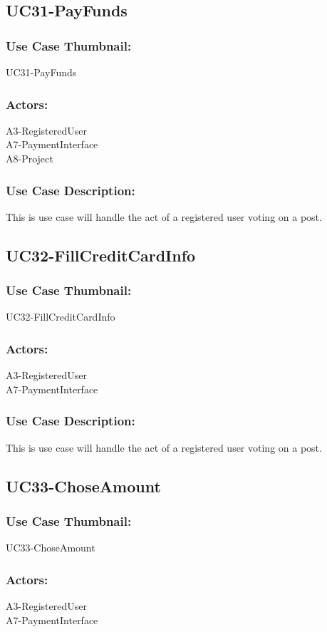 \documentclass[11pt, openany]{report}
\begin{document}
\subsection{UC31-PayFunds}
\label{sUC31}
\subsubsection*{Use Case Thumbnail:}
UC31-PayFunds
\subsubsection*{Actors:}
A3-RegisteredUser\\
A7-PaymentInterface\\
A8-Project
\subsubsection*{Use Case Description:}
This is use case will handle the act of a registered user voting on a post.

\subsection{UC32-FillCreditCardInfo}
\label{sUC32}
\subsubsection*{Use Case Thumbnail:}
UC32-FillCreditCardInfo
\subsubsection*{Actors:}
A3-RegisteredUser\\
A7-PaymentInterface\\
\subsubsection*{Use Case Description:}
This is use case will handle the act of a registered user voting on a post.

\subsection{UC33-ChoseAmount}
\label{sUC33}
\subsubsection*{Use Case Thumbnail:}
UC33-ChoseAmount
\subsubsection*{Actors:}
A3-RegisteredUser\\
A7-PaymentInterface\\
\end{document}
